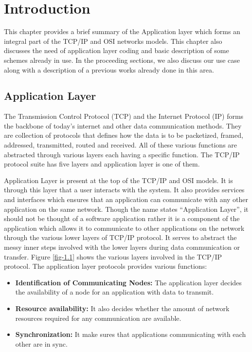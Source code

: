 \chapter{Introduction}
\graphicspath{{Chapter_1/Vector/}{Chapter_1/}}

This chapter provides a brief summary of the Application layer which forms an integral part of the TCP/IP and OSI networks models. This chapter also discusses the need of application layer coding and basic description of some schemes already in use. In the proceeding sections, we also discuss our use case along with a description of a previous works already done in this area.

\section{Application Layer}

The Transmission Control Protocol (TCP) and the Internet Protocol (IP) forms the backbone of today's internet and other data communication methods. They are collection of protocols that defines how the data is to be packetized, framed, addressed, transmitted, routed and received. All of these various functions are abstracted through various layers each having a specific function. The TCP/IP protocol suite has five layers and application layer is one of them.

Application Layer is present at the top of the TCP/IP and OSI models. It is through this layer that a user interacts with the system. It also provides services and interfaces which ensures that an application can communicate with any other application on the same network. Though the name states ``Application Layer'', it should not be thought of a software application rather it is a component of the application which allows it to communicate to other applications on the network through the various lower layers of TCP/IP protocol. It serves to abstract the messy inner steps involved with the lower layers during data communication or transfer. Figure \ref{fig-1.1} shows the various layers involved in the TCP/IP protocol. The application layer protocols provides various functions:
\begin{itemize}
	\item \textbf{Identification of Communicating Nodes:} The application layer decides the availability of a node for an application with data to transmit.
	\item \textbf{Resource availability:} It also decides whether the amount of network resources required for any communication are available.
	\item \textbf{Synchronization:} It make sures that applications communicating with each other are in sync.
\end{itemize}


